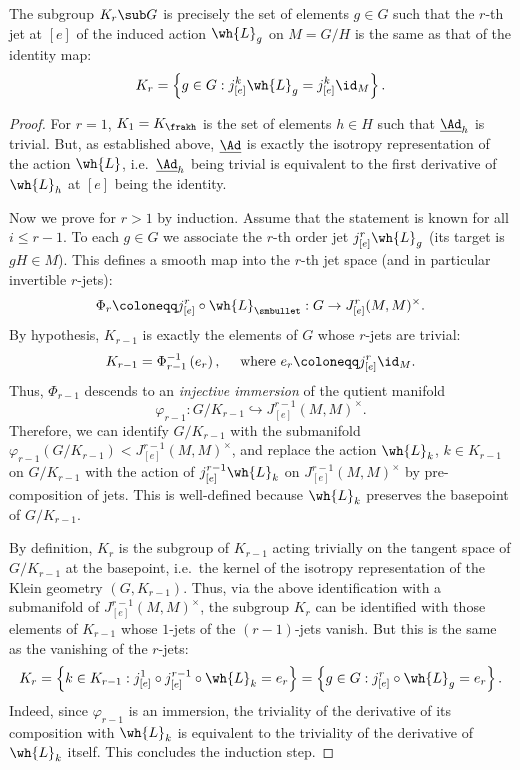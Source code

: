 \begin{lem}
    The subgroup $K_r\sub G$ is precisely the set of elements $g\in G$
    such that the $r$-th jet at $[e]$ of the induced action $\wh{L}_g$ on $M=G\slash H$ is the same as that of the identity map:
    \[K_r=\left\{g\in G: j^k_{[e]}\wh{L}_g=j^k_{[e]}\id_{M}\right\}.\]
\end{lem}
\begin{proof}
    For $r=1$, $K_1=K_{\frakh}$ is the set of elements $h\in H$ such that $\underline{\Ad}_h$ is trivial. But, as established above, $\underline{\Ad}$ is exactly the isotropy representation of the action $\wh{L}$, i.e.\ $\underline{\Ad}_h$ being trivial is equivalent to the first derivative of $\wh{L}_h$ at $[e]$ being the identity.

    Now we prove for $r>1$ by induction. Assume that the statement is known for all $i\leq r-1$. To each $g\in G$ we associate the $r$-th order jet $j^r_{[e]}\wh{L}_g$ (its target is $gH\in M$). This defines a smooth map into the $r$-th jet space (and in particular invertible $r$-jets):
    \[\Phi_r\coloneqq j_{[e]}^r\circ \wh{L}_{\smbullet}: G\to J^r_{[e]}(M,M)^\times.\]
    By hypothesis, $K_{r-1}$ is exactly the elements of $G$ whose $r$-jets are trivial:
    \[K_{r-1}=\Phi_{r-1}^{-1}\left(e_r\right), \quad \text{ where }e_r\coloneqq j^r_{[e]}\id_M.\]
    Thus, $\Phi_{r-1}$ descends to an \emph{injective immersion} of the qutient manifold
    \[\varphi_{r-1}:G\slash K_{r-1}\hookrightarrow J^{r-1}_{[e]}(M,M)^\times.\]
    Therefore, we can identify $G\slash K_{r-1}$ with the submanifold $\varphi_{r-1}(G\slash K_{r-1})< J^{r-1}_{[e]}(M,M)^\times$, and replace the action $\wh{L}_k$, $k\in K_{r-1}$ on $G\slash K_{r-1}$ with the action of $j^{r-1}_{[e]}\wh{L}_k$ on $J^{r-1}_{[e]}(M,M)^\times$ by pre-composition of jets. This is well-defined because $\wh{L}_k$ preserves the basepoint of $G\slash K_{r-1}$.
    
    By definition, $K_r$ is the subgroup of $K_{r-1}$ acting trivially on the tangent space of $G\slash K_{r-1}$ at the basepoint, i.e.\ the kernel of the isotropy representation of the Klein geometry $(G,K_{r-1})$. Thus, via the above identification with a submanifold of $J^{r-1}_{[e]}(M,M)^\times$, the subgroup $K_r$ can be identified with those elements of $K_{r-1}$ whose $1$-jets of the $(r-1)$-jets vanish. But this is the same as the vanishing of the $r$-jets: 
    \[K_r=\left\{k\in K_{r-1}: j^1_{[e]}\circ j^{r-1}_{[e]}\circ\wh{L}_k=e_r\right\}=\left\{g\in G: j^r_{[e]}\circ \wh{L}_g=e_r\right\}.\]
    Indeed, since $\varphi_{r-1}$ is an immersion, the triviality of the derivative of its composition with $\wh{L}_k$ is equivalent to the triviality of the derivative of $\wh{L}_k$ itself. This concludes the induction step.
\end{proof}



